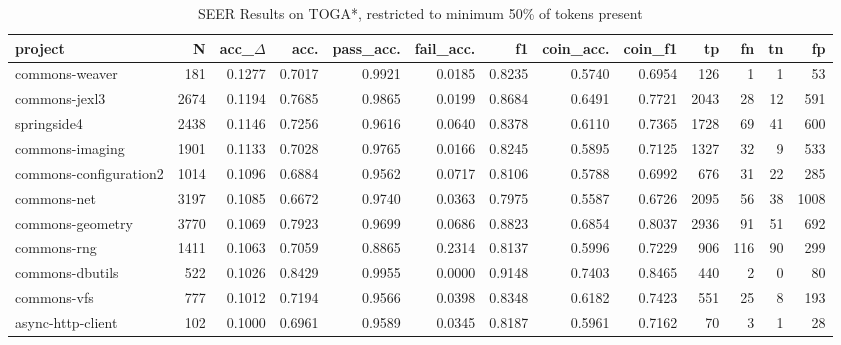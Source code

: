 \begin{table*}
\centering
\caption{SEER Results on TOGA*, restricted to minimum 50\% of tokens present}
\label{tab:toga_results_50}
\begin{tabular}{lrrrrrrrrrrrr}
\toprule
                project &       N &  acc\_$\Delta$ &    acc. &  pass\_acc. &  fail\_acc. &      f1 &  coin\_acc. &  coin\_f1 &      tp &    fn &   tn &     fp \\
\midrule
         commons-weaver &     181 &      0.1277 &  0.7017 &     0.9921 &     0.0185 &  0.8235 &     0.5740 &   0.6954 &     126 &     1 &    1 &     53 \\
          commons-jexl3 &    2674 &      0.1194 &  0.7685 &     0.9865 &     0.0199 &  0.8684 &     0.6491 &   0.7721 &    2043 &    28 &   12 &    591 \\
            springside4 &    2438 &      0.1146 &  0.7256 &     0.9616 &     0.0640 &  0.8378 &     0.6110 &   0.7365 &    1728 &    69 &   41 &    600 \\
        commons-imaging &    1901 &      0.1133 &  0.7028 &     0.9765 &     0.0166 &  0.8245 &     0.5895 &   0.7125 &    1327 &    32 &    9 &    533 \\
 commons-configuration2 &    1014 &      0.1096 &  0.6884 &     0.9562 &     0.0717 &  0.8106 &     0.5788 &   0.6992 &     676 &    31 &   22 &    285 \\
            commons-net &    3197 &      0.1085 &  0.6672 &     0.9740 &     0.0363 &  0.7975 &     0.5587 &   0.6726 &    2095 &    56 &   38 &   1008 \\
       commons-geometry &    3770 &      0.1069 &  0.7923 &     0.9699 &     0.0686 &  0.8823 &     0.6854 &   0.8037 &    2936 &    91 &   51 &    692 \\
            commons-rng &    1411 &      0.1063 &  0.7059 &     0.8865 &     0.2314 &  0.8137 &     0.5996 &   0.7229 &     906 &   116 &   90 &    299 \\
        commons-dbutils &     522 &      0.1026 &  0.8429 &     0.9955 &     0.0000 &  0.9148 &     0.7403 &   0.8465 &     440 &     2 &    0 &     80 \\
            commons-vfs &     777 &      0.1012 &  0.7194 &     0.9566 &     0.0398 &  0.8348 &     0.6182 &   0.7423 &     551 &    25 &    8 &    193 \\
      async-http-client &     102 &      0.1000 &  0.6961 &     0.9589 &     0.0345 &  0.8187 &     0.5961 &   0.7162 &      70 &     3 &    1 &     28 \\

\end{tabular}
\end{table*}
